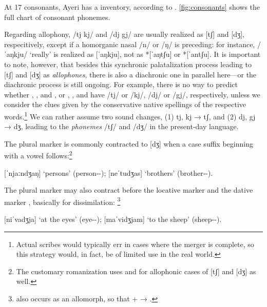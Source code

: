 At 17 consonants, Ayeri has a  inventory, according 
to \citet{wals1}. \autoref{fig:consonants} shows the full chart of consonant 
phonemes.

%
Regarding allophony, /tj kj/ and /dj gj/ are usually realized as [tʃ] and [dʒ], 
respecitively, except if a homorganic nasal /n/ or /ŋ/ is preceding: for 
instance,  /ˈaŋkju/ `really' is realized as [ˈaŋkju], not as 
*[ˈaŋtʃu] or *[ˈantʃu]. It is important to note, however, that besides this 
synchronic palatalization process leading to [tʃ] and [dʒ] as \emph{allophones}, 
there is also a diachronic one in parallel here---or the diachronic process is 
still ongoing. For example, there is no way to predict whether 
, , 
and , or , 
, and  have /tj/ or /kj/, /dj/ 
or /gj/, respectively, unless we consider the clues given by the conservative 
native spellings of the respective words.\footnote{Actual scribes would 
typically err in cases where the merger is complete, so this strategy would, in 
fact, be of limited use in the real world.} We can rather assume two sound 
changes, (1) tj, kj → tʃ, and (2) dj, gj → dʒ, leading to the \emph{phonemes} 
/tʃ/ and /dʒ/ in the present-day language.

\label{pluralmorph}
The plural marker  is commonly contracted to [dʒ] when a case 
suffix beginning with a vowel follows:\footnote{The customary romanization uses 
 and  for allophonic cases of [tʃ] and [dʒ] as well.}

\pex
	\a {} 
		[ˈnjaːndʒaŋ] `persons' (person-\Pl{}-\Aarg{});
	\a {} 
		[neˈtudʒas] `brothers' (brother-\Pl{}-\Parg{}).
\xe

The plural marker may also contract before the locative marker 
and the dative marker , basically for dissimilation:%
\footnote{ also occurs as an allomorph, so that 
 +  → .}

\pex
	\a {} 
		[niˈvadʒja] `at the eyes' (eye-\Pl{}-\Loc{});
	\a {} 
		[maˈvidʒjam] `to the sheep' (sheep-\Pl{}-\Dat{}).
\xe

